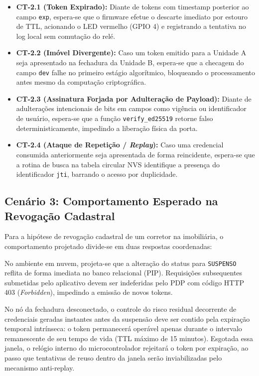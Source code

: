 \begin{itemize}
    \item \textbf{CT-2.1 (Token Expirado):} Diante de tokens com timestamp posterior ao campo \texttt{exp}, espera-se que o firmware efetue o descarte imediato por estouro de TTL, acionando o LED vermelho (GPIO 4) e registrando a tentativa no log local sem comutação do relé.
    \item \textbf{CT-2.2 (Imóvel Divergente):} Caso um token emitido para a Unidade A seja apresentado na fechadura da Unidade B, espera-se que a checagem do campo \texttt{dev} falhe no primeiro estágio algorítmico, bloqueando o processamento antes mesmo da computação criptográfica.
    \item \textbf{CT-2.3 (Assinatura Forjada por Adulteração de Payload):} Diante de adulterações intencionais de bits em campos como vigência ou identificador de usuário, espera-se que a função \texttt{verify\_ed25519} retorne falso deterministicamente, impedindo a liberação física da porta.
    \item \textbf{CT-2.4 (Ataque de Repetição / \textit{Replay}):} Caso uma credencial consumida anteriormente seja apresentada de forma reincidente, espera-se que a rotina de busca na tabela circular NVS identifique a presença do identificador \texttt{jti}, barrando o acesso por duplicidade.
\end{itemize}

\subsection{Cenário 3: Comportamento Esperado na Revogação Cadastral}
\label{subsec:res-cenario-3}

Para a hipótese de revogação cadastral de um corretor na imobiliária, o comportamento projetado divide-se em duas respostas coordenadas:

No ambiente em nuvem, projeta-se que a alteração do status para \texttt{SUSPENSO} reflita de forma imediata no banco relacional (PIP). Requisições subsequentes submetidas pelo aplicativo devem ser indeferidas pelo PDP com código HTTP 403 (\textit{Forbidden}), impedindo a emissão de novos tokens.

No nó da fechadura desconectado, o controle do risco residual decorrente de credenciais geradas instantes antes da suspensão deve ser contido pela expiração temporal intrínseca: o token permanecerá operável apenas durante o intervalo remanescente de seu tempo de vida (TTL máximo de 15 minutos). Esgotada essa janela, o relógio interno do microcontrolador rejeitará o token por expiração, ao passo que tentativas de reuso dentro da janela serão inviabilizadas pelo mecanismo anti-replay.

